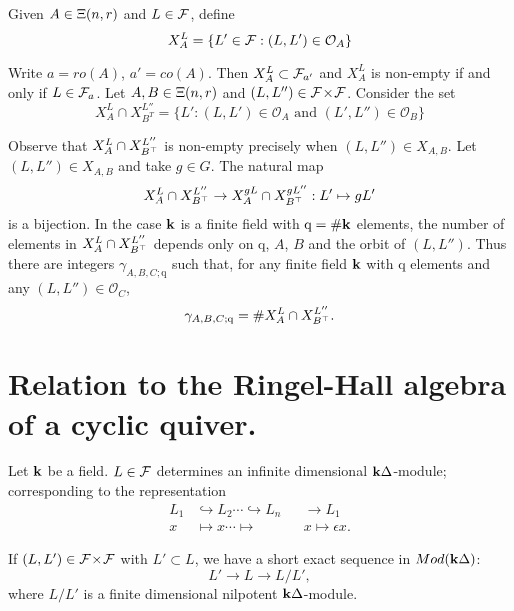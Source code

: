 \documentclass[a4paper, 11pt]{report}
\begin{document}
Given $A\in\Xi(n,r)$ and $L\in\mathcal{F}$, define
\begin{equation*}
X_A^L = \{L'\in\mathcal{F}:(L,L')\in\mathcal{O}_A\}
\end{equation*}

Write $a=ro(A)$, $a'=co(A)$. Then $X_A^L \subset \mathcal{F}_{a'}$ and $X_A^L$ is non-empty if and only if $L\in\mathcal{F}_a$. Let $A,B\in\Xi(n,r)$ and $(L,L'')\in{\mathcal{F}\!\times\!\mathcal{F}}$. Consider the set
\begin{equation*}
X_A^L\cap X_{B^T}^{L''} = \{L':(L,L')\in\mathcal{O}_A \text{ and } (L',L'')\in\mathcal{O}_B\}
\end{equation*}

Observe that $X_A^L\cap X_{B^\top}^{L''}$ is non-empty precisely when $(L,L'')\in X_{A,B}$. Let $(L,L'')\in X_{A,B}$ and take $g\in G$. The natural map
\begin{equation*}
X_A^L\cap X_{B^\top}^{L''}\to X_A^{gL}\cap X_{B^\top}^{gL''}:L'\mapsto gL'
\end{equation*}
is a bijection. In the case $\mathbf{k}$ is a finite field with $\mathrm{q}=\#\mathbf{k}$ elements, the number of elements in $X_A^L\cap X_{B^\top}^{L''}$ depends only on $\mathrm{q}$, $A$, $B$ and the orbit of $(L,L'')$. Thus there are integers $\gamma_{A,B,C;\mathrm{q}}$ such that, for any finite field $\mathbf{k}$ with $\mathrm{q}$ elements and any $(L,L'')\in\mathcal{O}_C$,
\begin{equation*}
\gamma_{A,B,C;\mathrm{q}} = \# X_A^L\cap X_{B^\top}^{L''}.
\end{equation*}

\section{Relation to the Ringel-Hall algebra of a cyclic quiver.}

Let $\mathbf{k}$ be a field. $L\in\mathcal{F}$ determines an infinite dimensional $\mathbf{k}\Delta$-module; corresponding to the representation
\begin{align*}
L_1 &\hookrightarrow L_2 \cdots\hookrightarrow L_n &&\to L_1\\
x &\mapsto x\cdots\mapsto && x\mapsto \epsilon x.
\end{align*}

If $(L,L')\in{\mathcal{F}\!\times\!\mathcal{F}}$ with $L'\subset L$, we have a short exact sequence in $Mod(\mathbf{k}\Delta)$:
\begin{equation*}
L'\to L\to L/{L'},
\end{equation*}
where $L/L'$ is a finite dimensional nilpotent $\mathbf{k}\Delta$-module.
\end{document}
